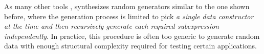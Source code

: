 As many other tools \tocite, {\dragen} synthesizes random generators similar to
the one shown before, where the generation process is limited to pick \emph{a
  single data constructor at the time and then recursively generate each
  required subexpression independently}.
%
%
%
In practice, this procedure is often too generic to generate random data with
enough structural complexity required for testing certain applications.


